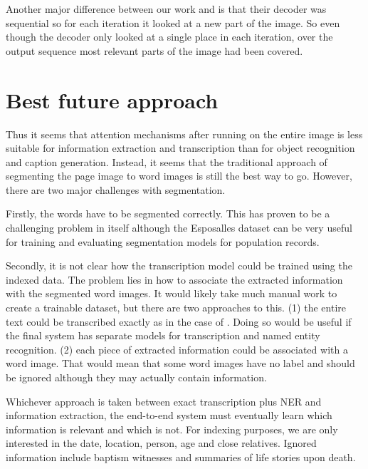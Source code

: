 Another major difference between our work and \cite{AttendAndTell} is that their decoder was sequential so for each iteration it looked at a new part of the image. So even though the decoder only looked at a single place in each iteration, over the output sequence most relevant parts of the image had been covered.


\section{Best future approach}

Thus it seems that attention mechanisms after running on the entire image is less suitable for information extraction and transcription than for object recognition and caption generation. Instead, it seems that the traditional approach of segmenting the page image to word images is still the best way to go. However, there are two major challenges with segmentation.

Firstly, the words have to be segmented correctly. This has proven to be a challenging problem in itself although the Esposalles dataset \cite{esposalles} can be very useful for training and evaluating segmentation models for population records.

Secondly, it is not clear how the transcription model could be trained using the indexed data. The problem lies in how to associate the extracted information with the segmented word images. It would likely take much manual work to create a trainable dataset, but there are two approaches to this. (1) the entire text could be transcribed exactly as in the case of \cite{esposalles}. Doing so would be useful if the final system has separate models for transcription and named entity recognition.
(2) each piece of extracted information could be associated with a word image. That would mean that some word images have no label and should be ignored although they may actually contain information.

Whichever approach is taken between exact transcription plus NER and information extraction, the end-to-end system must eventually learn which information is relevant and which is not.
For indexing purposes, we are only interested in the date, location, person, age and close relatives. Ignored information include baptism witnesses and summaries of life stories upon death.

